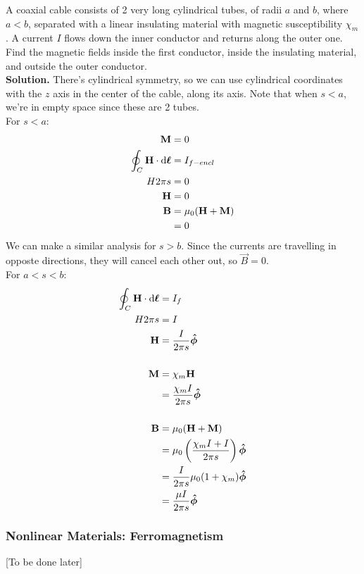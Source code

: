 \documentclass[a4paper]{article}
\begin{document}
\begin{eg}
	A coaxial cable consists of 2 very long cylindrical tubes,
	of radii $a$ and $b$, where $a < b$, separated
	with a linear insulating material with magnetic susceptibility
	$\chi_m$. A current $I$ flows down the inner conductor and returns
	along the outer one. Find the magnetic fields inside the first
	conductor, inside the insulating material, and outside the outer
	conductor.\\
	\textbf{Solution.}
	There's cylindrical symmetry, so we can use cylindrical coordinates
	with the $z$ axis in the center of the cable, along its axis. Note that
	when $s<a$, we're in empty space since these are 2 tubes.\\
	For $s<a$:
	\begin{align*}
		\boldsymbol{\mathbf{M}} &= 0\\
		\oint_C\boldsymbol{\mathbf{H}}\cdot\mathrm{d}\boldsymbol{\mathbf{\ell}} &= I_{f-encl}\\
		H2\pi s&= 0\\
		\boldsymbol{\mathbf{H}} &= 0\\
		\boldsymbol{\mathbf{B}} &= \mu_0(\boldsymbol{\mathbf{H}}+\boldsymbol{\mathbf{M}})\\
			&= 0
	\end{align*}
	We can make a similar analysis for $s > b$. Since the currents are
	travelling in opposte directions, they will cancel each other out,
	so $\vec{B} = 0$.\\
	For $a<s<b$:
	\begin{align*}
		\oint_C \boldsymbol{\mathbf{H}}\cdot\mathrm{d}\boldsymbol{\mathbf{\ell}} &= I_{f}\\
		H2\pi s &= I\\
		\boldsymbol{\mathbf{H}} &= \frac{I}{2\pi s}\boldsymbol{\mathbf{\hat{\phi}}}\\~\\
		\boldsymbol{\mathbf{M}} &= \chi_m\boldsymbol{\mathbf{H}}\\
			&= \frac{\chi_m I}{2\pi s}\boldsymbol{\mathbf{\hat{\phi}}}\\~\\
		\boldsymbol{\mathbf{B}} &= \mu_0(\boldsymbol{\mathbf{H}}+\boldsymbol{\mathbf{M}})\\
		&= \mu_0\left(\frac{\chi_mI + I}{2\pi s}\right)\boldsymbol{\mathbf{\hat{\phi}}}\\
		&= \frac{I}{2\pi s}\mu_0(1+\chi_m)\boldsymbol{\mathbf{\hat{\phi}}}\\
		&= \frac{\mu I}{2\pi s}\boldsymbol{\mathbf{\hat{\phi}}}
	\end{align*}
\end{eg}

\subsubsection{Nonlinear Materials: Ferromagnetism}
[To be done later]
\end{document}
